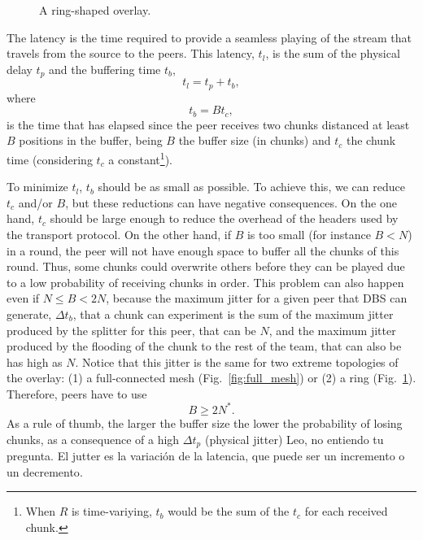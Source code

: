 

\label{sec:latency}

\begin{figure}
  \centering
  \vbox{}
  \caption{A ring-shaped overlay.}
  \label{fig:ring}
\end{figure}

The latency is the time required to provide a seamless playing of
the stream that travels from the source to the peers. This latency,
$t_l$, is the sum of the physical delay $t_p$ and the buffering time
$t_b$,
\begin{equation}
  \label{eq:t_l}
  t_l = t_p + t_b,
\end{equation}
where
\begin{equation}
  \label{eq:t_b}
  t_b = Bt_c,
\end{equation}
is the time that has elapsed since the peer receives two chunks
distanced at least $B$ positions in the buffer, being $B$ the buffer
size (in chunks) and $t_c$ the chunk time (considering $t_c$ a
constant\footnote{When $R$ is time-variying, $t_b$ would be the sum of
  the $t_c$ for each received chunk.}).

To minimize $t_l$, $t_b$ should be as small as possible. To achieve
this, we can reduce $t_c$ and/or $B$, but these reductions can have
negative consequences. On the one hand, $t_c$ should be large enough
to reduce the overhead of the headers used by the transport
protocol. On the other hand, if $B$ is too small (for instance $B<N$)
in a round, the peer will not have enough space to buffer all the
chunks of this round. Thus, some chunks could overwrite others before
they can be played due to a low probability of receiving chunks in
order. This problem can also happen even if $N\leq B<2N$, because the
maximum jitter for a given peer that DBS can generate, $\Delta t_b$,
that a chunk can experiment is the sum of the maximum jitter produced
by the splitter for this peer, that can be $N$, and the maximum jitter
produced by the flooding of the chunk to the rest of the team, that
can also be has high as $N$. Notice that this jitter is the same for
two extreme topologies of the overlay: (1) a full-connected mesh
(Fig.~\ref{fig:full_mesh}) or (2) a ring
(Fig.~\ref{fig:ring}). Therefore, peers have to use
\begin{equation}
  \label{eq:minimum_B}
  B\ge 2N^*.
\end{equation}
As a rule of thumb, the larger the buffer size the lower the
probability of losing chunks, as a consequence of a high $\Delta t_p$
(physical jitter)  {\color{red}
  Leo, no entiendo tu pregunta. El jutter es la variación de la
  latencia, que puede ser un incremento o un decremento}.

